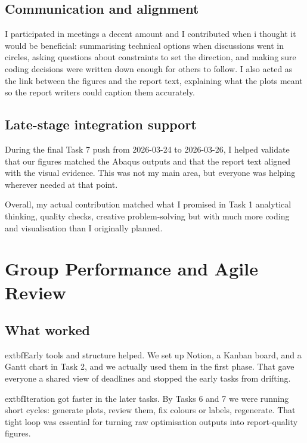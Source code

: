 \section{Communication and alignment}


\noindent I participated in meetings a decent amount and I contributed when i thought it would be beneficial: summarising technical options when discussions went in circles, asking questions about constraints to set the direction, and making sure coding decisions were written down enough for others to follow. I also acted as the link between the figures and the report text, explaining what the plots meant so the report writers could caption them accurately.


\section{Late-stage integration support}


\noindent During the final Task 7 push from 2026-03-24 to 2026-03-26, I helped validate that our figures matched the Abaqus outputs and that the report text aligned with the visual evidence. This was not my main area, but everyone was helping wherever needed at that point.


\noindent Overall, my actual contribution matched what I promised in Task 1 \textemdash{}  analytical thinking, quality checks, creative problem-solving \textemdash{}  but with much more coding and visualisation than I originally planned.


\chapter{Group Performance and Agile Review}


\section{What worked}


\noindent 	extbf{Early tools and structure helped.} We set up Notion, a Kanban board, and a Gantt chart in Task 2, and we actually used them in the first phase. That gave everyone a shared view of deadlines and stopped the early tasks from drifting.


\noindent 	extbf{Iteration got faster in the later tasks.} By Tasks 6 and 7 we were running short cycles: generate plots, review them, fix colours or labels, regenerate. That tight loop was essential for turning raw optimisation outputs into report-quality figures.


